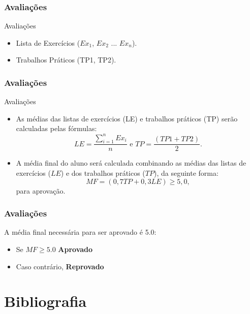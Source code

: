 \documentclass[aspectratio=169]{beamer}
\begin{document}
\begin{frame}
\frametitle{Avaliações}
Avaliações
\begin{itemize}
 \item Lista de Exercícios ($Ex_1$, $Ex_2$ ... $Ex_n$).
 \item Trabalhos Práticos (TP1, TP2).
\end{itemize}
\end{frame}


\begin{frame}
\frametitle{Avaliações}
Avaliações
\begin{itemize}
 \item As médias das listas de exercícios (LE) e trabalhos práticos (TP) serão calculadas pelas fórmulas: 
 \begin{equation}
   LE = \frac { \sum_{i=1}^{n} Ex_i } {n}   \textrm{ e }  TP = \frac{(TP1+ TP2)}{2} \nonumber.
 \end{equation}
 \item A média final do aluno será calculada combinando as médias das listas de exercícios ($LE$) e dos trabalhos práticos ($TP$), da seguinte forma: 
 \begin{equation}
   MF = (0,7TP + 0,3LE) \geq 5,0, \nonumber
 \end{equation}
  para aprovação.
\end{itemize}
\end{frame}


\begin{frame}
\frametitle{Avaliações}
A média final necessária para ser aprovado é 5.0:
\begin{itemize}
 \item Se $MF \geq 5.0$ {\bf Aprovado}
 \item Caso contrário, {\bf Reprovado}
\end{itemize}
\end{frame}

\section{Bibliografia}
\end{document}
